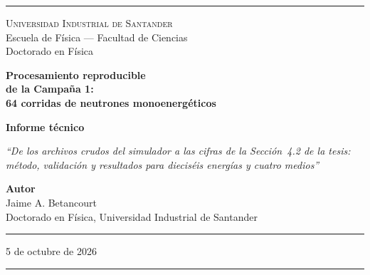 \documentclass[11pt,a4paper]{article}
\begin{document}
\pagestyle{empty}

\begin{titlepage}
\begin{center}

\vspace*{0.5cm}
\textcolor{reglaColor}{\rule{\linewidth}{1.2pt}}

\vspace{1.3cm}
{\Large\scshape Universidad Industrial de Santander}\\[0.2cm]
{\large Escuela de Física --- Facultad de Ciencias}\\[0.2cm]
{\large Doctorado en Física}

\vspace{2.2cm}
{\Huge\bfseries\color{tituloColor} Procesamiento reproducible\\[0.2cm]
de la Campaña 1:\\[0.2cm] 64 corridas de neutrones monoenergéticos}

\vspace{1.8cm}
{\large\textbf{Informe técnico}}

\vspace{0.6cm}
\begin{minipage}{0.82\linewidth}
\centering
\textit{``De los archivos crudos del simulador a las cifras de la Sección~4.2 de la tesis: método, validación y resultados para dieciséis energías y cuatro medios''}
\end{minipage}

\vfill

{\large\textbf{Autor}}\\[0.15cm]
Jaime A. Betancourt\\[0.1cm]
Doctorado en Física, Universidad Industrial de Santander

\vspace{1.2cm}
\textcolor{reglaColor}{\rule{0.5\linewidth}{0.6pt}}

\vspace{1cm}
5 de octubre de 2026

\vspace{1cm}
\textcolor{reglaColor}{\rule{\linewidth}{1.2pt}}

\end{center}
\end{titlepage}

\pagestyle{plain}
\end{document}
